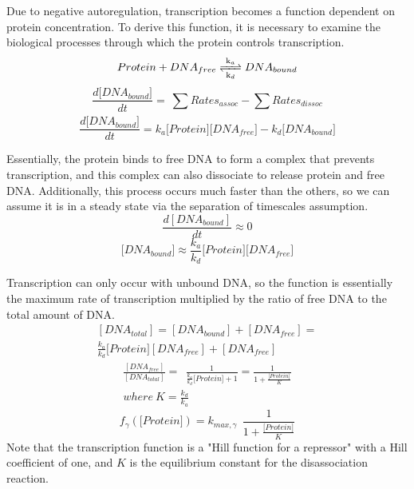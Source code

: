 \documentclass[conference]{IEEEtran}
\begin{document}
Due to negative autoregulation, transcription becomes a function dependent on protein concentration. To derive this function, it is necessary to examine the biological processes through which the protein controls transcription.
\begin{equation}
Protein +  DNA_{free}
\ce{<=>[k_{a}][k_{d}]} 
DNA_{bound}
\end{equation}
\begin{equation}
\frac{d\lbrack DNA_{bound}\rbrack}{dt} = \ \sum_{}^{}{Rates}_{assoc} - \sum_{}^{}{Rates}_{dissoc}\label{eq88}
\end{equation}
\begin{equation}
\frac{d\lbrack DNA_{bound}\rbrack}{dt} = k_{a}\lbrack Protein\rbrack\lbrack DNA_{free}\rbrack - k_{d}\lbrack DNA_{bound}\rbrack\label{eq89}
\end{equation}

Essentially, the protein binds to free DNA to form a complex that prevents transcription, and this complex can also dissociate to release protein and free DNA. Additionally, this process occurs much faster than the others, so we can assume it is in a steady state via the separation of timescales assumption.
\begin{equation}
\frac{d\left\lbrack DNA_{bound} \right\rbrack}{dt}  \approx 0\label{eq5}
\end{equation}
\begin{equation}
\lbrack DNA_{bound}\rbrack \approx \frac{k_{a}}{k_{d}}\lbrack Protein\rbrack\lbrack DNA_{free}\rbrack\label{eq6}
\end{equation}

Transcription can only occur with unbound DNA, so the function is essentially the maximum rate of transcription multiplied by the ratio of free DNA to the total amount of DNA.
\begin{multline}
\left\lbrack DNA_{total} \right\rbrack = \left\lbrack DNA_{bound} \right\rbrack + \left\lbrack DNA_{free} \right\rbrack = \\ \frac{k_{a}}{k_{d}}\lbrack Protein\rbrack\left\lbrack DNA_{free} \right\rbrack + \left\lbrack DNA_{free} \right\rbrack\label{eq7}
\end{multline}
\begin{multline}
\frac{\left\lbrack DNA_{free} \right\rbrack}{\left\lbrack DNA_{total} \right\rbrack} = \ \ \frac{1}{\frac{k_{a}}{k_{d}}\lbrack Protein\rbrack + 1} = \frac{1}{1 + \frac{\lbrack Protein\rbrack}{K}} \\ where\ K = \frac{k_{d}}{k_{a}}\label{eq8}
\end{multline}
\begin{equation}
f_{\gamma}\left( \lbrack Protein\rbrack \right) = k_{max,\gamma}\ \ \frac{1}{1 + \frac{\lbrack Protein\rbrack}{K}}\label{eq9}
\end{equation}
Note that the transcription function is a "Hill function for a repressor" with a Hill coefficient of one, and $K$ is the equilibrium constant for the disassociation reaction.
\end{document}
